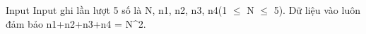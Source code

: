 Input
Input ghi lần lượt 5 số là N, n1, n2, n3, n4(1 $\le$ N $\le$ 5). Dữ liệu vào luôn đảm bảo n1+n2+n3+n4 = N^2.